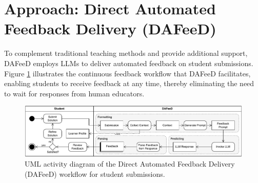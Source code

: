 \documentclass[sigconf,screen,review,anonymous]{acmart}
\begin{document}









\section{Approach: Direct Automated Feedback Delivery (DAFeeD)} %
\label{sec:approach:DAFeeD}

To complement traditional teaching methods and provide additional support, DAFeeD employs LLMs to deliver automated feedback on student submissions.
Figure \ref{fig:DAFeeD-workflow} illustrates the continuous feedback workflow that DAFeeD facilitates, enabling students to receive feedback at any time, thereby eliminating the need to wait for responses from human educators.

\begin{figure}[htbp]
  \centering
  \includegraphics[width=\linewidth]{figures/DAFeeD-ActivityDiagram_alternative.pdf}
  \vspace{-6mm}
  \caption{UML activity diagram of the Direct Automated Feedback Delivery (DAFeeD) workflow for student submissions.}
  \label{fig:DAFeeD-workflow}
  \vspace{-3mm}
\end{figure}
\end{document}
